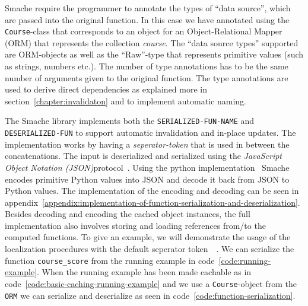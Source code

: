 \begin{figure*}[ht!]
  
  \caption{Implementation of basic caching on the running example}
  \label{code:basic-caching-running-example}
\end{figure*}

Smache require the programmer to annotate the types of ``data source'', which are passed into the original function. In this case we have annotated using the \verb$Course$-class that corresponds to an object for an Object-Relational Mapper (ORM) that represents the collection \emph{course}. The ``data source types'' supported are ORM-objects as well as the ``Raw''-type that represents primitive values (such as strings, numbers etc.). The number of type annotations has to be the same number of arguments given to the original function. The type annotations are used to derive direct dependencies as explained more in section~\ref{chapter:invalidaton} and to implement automatic naming.

The Smache library implements both the \verb$SERIALIZED-FUN-NAME$ and \verb$DESERIALIZED-FUN$ to support automatic invalidation and in-place updates. The implementation works by having a \emph{seperator-token} that is used in between the concatenations. The input is deserialized and serialized using the \emph{JavaScript Object Notation (JSON)}protocol~\cite{docs:json}. Using the python implementation~\cite{docs:python-json} Smache encodes primitive Python values into JSON and decode it back from JSON to Python values. The implementation of the encoding and decoding can be seen in appendix~\ref{appendix:implementation-of-function-serialization-and-deserialization}. Besides decoding and encoding the cached object instances, the full implementation also involves storing and loading references from/to the computed functions.
To give an example, we will demonstrate the usage of the localization procedures with the default seperator token $~~~$. We can serialize the function \verb$course_score$ from the running example in code~\ref{code:running-example}. When the running example has been made cachable as in code~\ref{code:basic-caching-running-example} and we use a \verb$Course$-object from the \verb$ORM$ we can serialize and deserialize as seen in code~\ref{code:function-serialization}.

\begin{figure*}[ht!]
  
  \caption{Example of how function serialization and deserialization can be done in Smache}
  \label{code:function-serialization}
\end{figure*}

